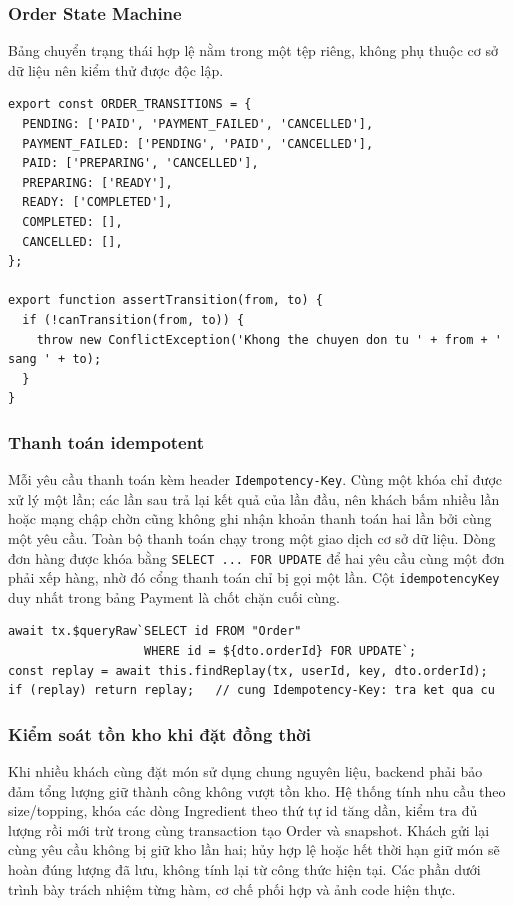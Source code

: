 \documentclass[a4paper]{article}
\begin{document}
\subsubsection{Order State Machine}
Bảng chuyển trạng thái hợp lệ nằm trong một tệp riêng, không phụ thuộc cơ sở dữ liệu nên kiểm thử được độc lập.
\begin{lstlisting}[style=brew]
export const ORDER_TRANSITIONS = {
  PENDING: ['PAID', 'PAYMENT_FAILED', 'CANCELLED'],
  PAYMENT_FAILED: ['PENDING', 'PAID', 'CANCELLED'],
  PAID: ['PREPARING', 'CANCELLED'],
  PREPARING: ['READY'],
  READY: ['COMPLETED'],
  COMPLETED: [],
  CANCELLED: [],
};

export function assertTransition(from, to) {
  if (!canTransition(from, to)) {
    throw new ConflictException('Khong the chuyen don tu ' + from + ' sang ' + to);
  }
}
\end{lstlisting}

\subsubsection{Thanh toán idempotent}
Mỗi yêu cầu thanh toán kèm header \texttt{Idempotency-Key}. Cùng một khóa chỉ được xử lý một lần; các lần sau trả lại kết quả của lần đầu, nên khách bấm nhiều lần hoặc mạng chập chờn cũng không ghi nhận khoản thanh toán hai lần bởi cùng một yêu cầu. Toàn bộ thanh toán chạy trong một giao dịch cơ sở dữ liệu. Dòng đơn hàng được khóa bằng \texttt{SELECT ... FOR UPDATE} để hai yêu cầu cùng một đơn phải xếp hàng, nhờ đó cổng thanh toán chỉ bị gọi một lần. Cột \texttt{idempotencyKey} duy nhất trong bảng Payment là chốt chặn cuối cùng.
\begin{lstlisting}[style=brew]
await tx.$queryRaw`SELECT id FROM "Order"
                   WHERE id = ${dto.orderId} FOR UPDATE`;
const replay = await this.findReplay(tx, userId, key, dto.orderId);
if (replay) return replay;   // cung Idempotency-Key: tra ket qua cu
\end{lstlisting}

\subsubsection{Kiểm soát tồn kho khi đặt đồng thời}
Khi nhiều khách cùng đặt món sử dụng chung nguyên liệu, backend phải bảo đảm tổng lượng giữ thành công không vượt tồn kho. Hệ thống tính nhu cầu theo size/topping, khóa các dòng Ingredient theo thứ tự id tăng dần, kiểm tra đủ lượng rồi mới trừ trong cùng transaction tạo Order và snapshot. Khách gửi lại cùng yêu cầu không bị giữ kho lần hai; hủy hợp lệ hoặc hết thời hạn giữ món sẽ hoàn đúng lượng đã lưu, không tính lại từ công thức hiện tại. Các phần dưới trình bày trách nhiệm từng hàm, cơ chế phối hợp và ảnh code hiện thực.

\end{document}
